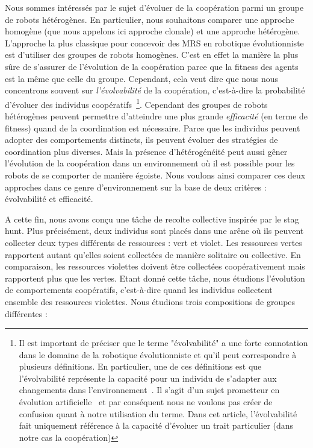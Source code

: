 			Nous sommes intéressés par le sujet d'évoluer de la coopération parmi un groupe de robots hétérogènes. En particulier, nous souhaitons comparer une approche homogène (que nous appelons ici approche clonale) et une approche hétérogène. L'approche la plus classique pour concevoir des MRS en robotique évolutionniste est d'utiliser des groupes de robots homogènes. C'est en effet la manière la plus sûre de s'assurer de l'évolution de la coopération parce que la fitness des agents est la même que celle du groupe. Cependant, cela veut dire que nous nous concentrons souvent sur \emph{l'évolvabilité} de la coopération, c'est-à-dire la probabilité d'évoluer des individus coopératifs~\footnote{Il est important de préciser que le terme "évolvabilité" a une forte connotation dans le domaine de la robotique évolutionniste et qu'il peut correspondre à plusieurs définitions. En particulier, une de ces définitions est que l'évolvabilité représente la capacité pour un individu de s'adapter aux changements dans l'environnement~\parencite{Wagner1996}. Il s'agit d'un sujet prometteur en évolution artificielle~\parencite{Banzhaf2006, Lehman2013, Doncieux2015a, Taylor2016} et par conséquent nous ne voulons pas créer de confusion quant à notre utilisation du terme. Dans cet article, l'évolvabilité fait uniquement référence à la capacité d'évoluer un trait particulier (dans notre cas la coopération)}. Cependant des groupes de robots hétérogènes peuvent permettre d'atteindre une plus grande \emph{efficacité} (en terme de fitness) quand de la coordination est nécessaire. Parce que les individus peuvent adopter des comportements distincts, ils peuvent évoluer des stratégies de coordination plus diverses. Mais la présence d'hétérogénéité peut aussi gêner l'évolution de la coopération dans un environnement où il est possible pour les robots de se comporter de manière égoiste. Nous voulons ainsi comparer ces deux approches dans ce genre d'environnement sur la base de deux critères : évolvabilité et efficacité.

			A cette fin, nous avons conçu une tâche de recolte collective inspirée par le stag hunt. Plus précisément, deux individus sont placés dans une arêne où ils peuvent collecter deux types différents de ressources : vert et violet. Les ressources vertes rapportent autant qu'elles soient collectées de manière solitaire ou collective. En comparaison, les ressources violettes doivent être collectées coopérativement mais rapportent plus que les vertes. Etant donné cette tâche, nous étudions l'évolution de comportements coopératifs, c'est-à-dire quand les individus collectent ensemble des ressources violettes. Nous étudions trois compositions de groupes différentes :


